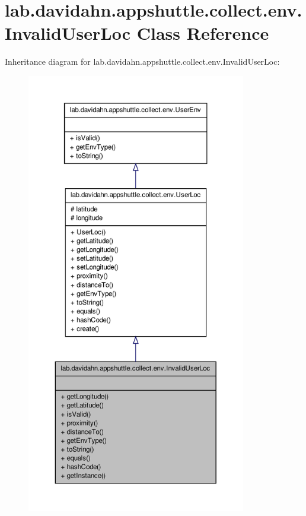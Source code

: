 \hypertarget{classlab_1_1davidahn_1_1appshuttle_1_1collect_1_1env_1_1_invalid_user_loc}{\section{lab.\-davidahn.\-appshuttle.\-collect.\-env.\-Invalid\-User\-Loc \-Class \-Reference}
\label{classlab_1_1davidahn_1_1appshuttle_1_1collect_1_1env_1_1_invalid_user_loc}
}


\-Inheritance diagram for lab.\-davidahn.\-appshuttle.\-collect.\-env.\-Invalid\-User\-Loc\-:
\nopagebreak
\begin{figure}[H]
\begin{center}
\leavevmode
\includegraphics[height=550pt]{classlab_1_1davidahn_1_1appshuttle_1_1collect_1_1env_1_1_invalid_user_loc__inherit__graph}
\end{center}
\end{figure}


